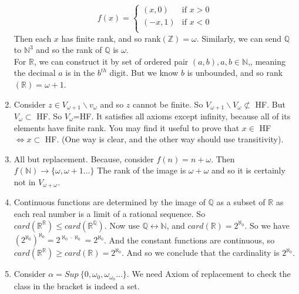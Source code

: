 \begin{enumerate}
    \begin{equation*}
    f(x)= \left\{
    \begin{array}{ll}
    (x,0) & \text{if }x>0\\
    (-x,1) & \text{if }x<0 \\
    \end{array} \right.
    \end{equation*}
    Then each $x$ has finite rank, and so rank$(\mathbb{Z}) =\omega$.
    Similarly, we can send $\mathbb{Q}$ to $\mathbb{N}^3$ and so the rank of $\mathbb{Q}$ is $\omega$.\\
    For $\mathbb{R}$, we can construct it by set of ordered pair $(a,b), a,b \in \mathbb{N}$,, meaning the decimal $a$ is in the $b^{th}$ digit. But we know $b$ is unbounded, and so rank$(\mathbb{R})=\omega+1$.\\
\item Consider $z \in V_{\omega+1} \backslash v_\omega$ and so $z$ cannot be finite. So $V_{\omega+1} \backslash V_\omega \not \subset$ HF. But $V_\omega \subset$ HF. So $V_\omega$=HF.
    It satisfies all axioms except infinity, because all of its elements have finite rank. You may find it useful to prove that $x \in$ HF $\iff x \subset$ HF. (One way is clear, and the other way should use transitivity).\\
\item All but replacement. Because, consider $f(n)=n+\omega$. Then $f(\mathbb{N}) \rightarrow \{\omega, \omega+1 \ldots\}$ The rank of the image is $\omega+\omega$ and so it is certainly not in $V_{\omega+\omega}$.\\
\item Continuous functions are determined by the image of $\mathbb{Q}$ as a subset of $\mathbb{R}$ as each real number is a limit of a rational sequence. So $card(\mathbb{R}^\mathbb{R}) \le card(\mathbb{R}^\mathbb{Q})$. Now use $\mathbb{Q} \leftrightarrow \mathbb{N}$, and $card(\mathbb{R})=2^{\aleph_0}$. So we have $(2^{\aleph_0})^{\aleph_0}=2^{\aleph_0 \cdot \aleph_0} = 2^{\aleph_0}$. And the constant functions are continuous, so $card(\mathbb{R}^\mathbb{R}) \ge card(\mathbb{R})= 2 ^{\aleph_0}$. And so we conclude that the cardinality is $2^{\aleph_0}$.\\
\item Consider $\alpha= Sup~\{0,\omega_0,\omega_{\omega_0} \ldots\}$. We need Axiom of replacement to check the class in the bracket is indeed a set.\\

\end{enumerate}

